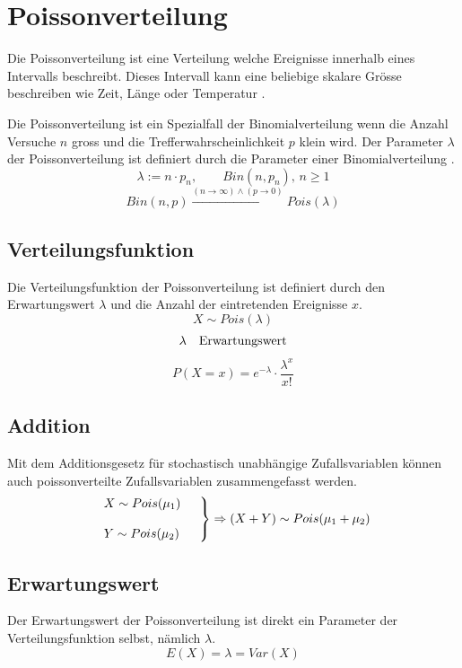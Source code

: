 \clearpage
\newpage
\section{Poissonverteilung}
Die Poissonverteilung ist eine Verteilung welche Ereignisse
innerhalb eines Intervalls beschreibt. Dieses Intervall kann
eine beliebige skalare Grösse beschreiben wie Zeit, Länge oder
Temperatur \parencite[307]{oreilly}.

Die Poissonverteilung ist ein Spezialfall der Binomialverteilung
wenn die Anzahl Versuche $n$ gross und die 
Trefferwahrscheinlichkeit $p$ klein wird. Der Parameter $\lambda$
der Poissonverteilung ist definiert durch die Parameter einer
Binomialverteilung \parencite[197]{henze}.
\[ 
	\lambda := n \cdot p_n, \qquad Bin(n, p_n),\,n\geq1
\]
\[ 
	Bin(n,p) \xrightarrow{
		(n \rightarrow \infty) 
		\land
		(p \rightarrow 0)}
	Pois(\lambda)
\]

\newpage

\subsection{Verteilungsfunktion}
Die Verteilungsfunktion der Poissonverteilung ist definiert
durch den Erwartungswert $\lambda$ und die Anzahl der eintretenden
Ereignisse $x$.
\[  
	X \sim Pois(\lambda)
\]
\[  \begin{array}{l l}
	\lambda	
		& \text{Erwartungswert}
\end{array} \]
\[  
	P(X=x) = e^{-\lambda} \cdot \frac{\lambda^x}{x!}
\]

\subsection{Addition}
Mit dem Additionsgesetz für stochastisch unabhängige Zufallsvariablen 
können auch poissonverteilte Zufallsvariablen zusammengefasst werden.
\[  
	\left.\begin{array}{l l}
		X \sim Pois(\mu_1) & \\
		& \\
		Y \sim Pois(\mu_2) & \\
	\end{array} \right\} 
	\Rightarrow (X+Y) \sim Pois(\mu_1 + \mu_2)
\]

\subsection{Erwartungswert}
Der Erwartungswert der Poissonverteilung ist direkt ein Parameter
der Verteilungsfunktion selbst, nämlich $\lambda$.
\[  
	E(X) = \lambda = Var(X) 
\]

